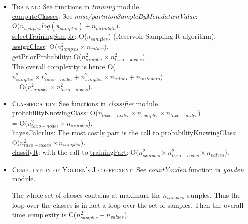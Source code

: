 \documentclass{report}
\begin{document}
\begin{itemize}
\item \textsc{Training:} See functions in \emph{training} module.\\

\uline{computeClasses}: See \emph{misc/partitionSampleByMetadatumValue}:\\
O($n_{samples}log(n_{samples}) + n_{metadata}$).\\

\uline{selectTrainingSample}: O($n_{samples}$) (Reservoir Sampling R algorithm).\\

\uline{assignClass}: O($n_{samples}^{2} \times n_{values}$).\\

\uline{getPriorProbability}: O($n_{samples}^{2} \times n_{taxo-nodes}^{2}$).\\

The overall complexity is hence O($n_{samples}^{2} \times n_{taxo-nodes}^{2} + n_{samples}^{2} \times n_{values} + n_{metadata}$)\\
 = O($n_{samples}^{2} \times n_{taxo-nodes}^{2}$). \\

\item \textsc{Classification:} See functions in \emph{classifier} module.\\

\uline{probabilityKnowingClass}: O($n_{taxo-nodes} \times n_{samples} \times n_{taxo-nodes}$)\\
= O($n_{taxo-nodes}^{2} \times n_{samples}$).\\

\uline{bayesCalculus}: The most costly part is the call to \uline{probabilityKnowingClass}: O($n_{taxo-nodes}^{2} \times n_{samples}$). \\

\uline{classifyIt}: with the call to \uline{trainingPart}: O($n_{samples}^{2} \times n_{taxo-nodes}^{2} \times n_{values}$).\\

\item \textsc{Computation of Youden's J coefficient:} See \emph{countYouden} function in \emph{youden} module.

The whole set of classes contains at maximum the $n_{samples}$ samples. Thus the loop over the classes is in fact a loop over the set of samples. Then the overall time complexity is O($n_{samples}^{2} + n_{values}$).\\

\end{itemize}
\end{document}
